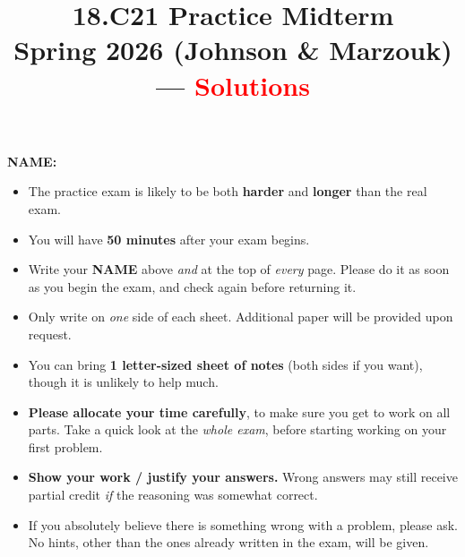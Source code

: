 \documentclass[12pt]{article}
\title{18.C21 Practice Midterm \\
Spring 2026 (Johnson \& Marzouk)
\ifdefined\solutions
--- \textcolor{red}{Solutions}
\fi
}
\author{}
\date{}
\begin{document}
\maketitle

\ifx\solutions\undefined

{\vspace{1.2cm} \hspace{1cm}
{\Large \textbf{NAME:} \dotfill}
\hspace{2cm}\ \vspace{1cm}}

\fi

\begin{itemize}

\item The practice exam is likely to be both \textbf{harder} and \textbf{longer} than the real exam.

\item You will have \textbf{50 minutes} after your exam begins.

\item Write your \textbf{NAME} above \emph{and} at the top of \emph{every} page. Please do it as soon as you begin the exam, and check again before returning it. 

\item Only write on \emph{one} side of each sheet.  Additional paper will be provided upon request.

\item You can bring \textbf{1 letter-sized sheet of notes} (both sides if you want), though it is unlikely to help much.

\item
\textbf{Please allocate your time carefully}, to make sure you get to work on all parts.  Take a quick look at the \emph{whole exam}, before starting working on your first problem.

\item \textbf{Show your work / justify your answers.}  Wrong answers may still receive partial credit \emph{if} the reasoning was somewhat correct.

\item If you absolutely believe there is something wrong with a problem, please ask. No hints, other than the ones already written in the exam, will be given.


\end{itemize}
\end{document}
